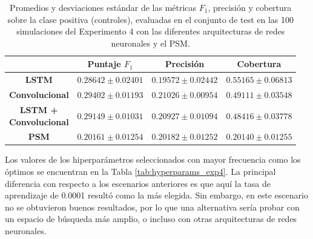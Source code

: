 \documentclass[../../main.tex]{subfiles}
\begin{document}
\begin{table}[H]
    \centering
    \renewcommand{\arraystretch}{1.2}
    \begin{tabular}{|c|c|c|c|}
        \hline
         & \textbf{Puntaje} \(F_1\) & \textbf{Precisión} & \textbf{Cobertura} \\ \hline\hline
        \textbf{LSTM}
            & $0.28642 \pm 0.02401$ & $0.19572 \pm 0.02442$ & $\mathbf{0.55165 \pm 0.06813}$ \\ \hline
        \textbf{Convolucional}
            & $\mathbf{0.29402 \pm 0.01193}$ & $\mathbf{0.21026 \pm 0.00954}$ & $0.49111 \pm 0.03548$ \\ \hline
        \makecell{\textbf{LSTM +} \\ \textbf{Convolucional}}
            & $0.29149 \pm 0.01031$ & $0.20927 \pm 0.01094$ & $0.48416 \pm 0.03778$ \\ \hline
        \textbf{PSM}
            & $0.20161 \pm 0.01254$ & $0.20182 \pm 0.01252$ & $0.20140 \pm 0.01255$ \\
        \hline
    \end{tabular}
    \caption{Promedios y desviaciones estándar de las métricas \(F_1\), precisión y
    cobertura sobre la clase positiva (controles), evaluadas en el conjunto de test en las
    100 simulaciones del Experimento 4 con las diferentes arquitecturas de redes
    neuronales y el PSM.}
    \label{tab:results_exp4}
\end{table}

Los valores de los hiperparámetros seleccionados con mayor frecuencia como los óptimos se
encuentran en la Tabla \ref{tab:hyperparams_exp4}. La principal diferencia con respecto a
los escenarios anteriores es que aquí la tasa de aprendizaje de 0.0001 resultó como la más
elegida. Sin embargo, en este escenario no se obtuvieron buenos resultados, por lo que una
alternativa sería probar con un espacio de búsqueda más amplio, o incluso con otras
arquitecturas de redes neuronales.
\end{document}
